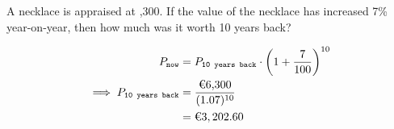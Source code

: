 

\question[2]   A necklace is appraised at ,300. If the value of
the necklace has increased 7\% year-on-year, then how much was it worth 
10 years back?



\ifprintanswers
\fi 

\begin{solution}[\halfpage]
	\begin{align}
		P_{\texttt{now}} &= P_{\texttt{10 years back}}\cdot\left( 1 + \dfrac{7}{100}\right)^{10} \\
		\implies P_{\texttt{10 years back}} &= \dfrac{\text{\texteuro 6,300}}{(1.07)^{10}} \\
		&= \text{\texteuro} 3,202.60
	\end{align}
\end{solution}
\ifprintanswers\begin{codex}\end{codex}\fi
